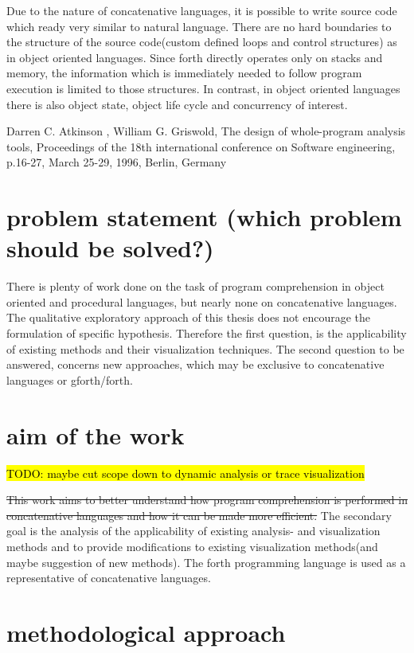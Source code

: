 Due to the nature of concatenative languages, it is possible to write source code which ready very similar to natural language. There are no hard boundaries to the structure of the source code(custom defined loops and control structures) as in object oriented languages. Since forth directly operates only on stacks and memory, the information which is immediately needed to follow program execution is limited to those structures. In contrast, in object oriented languages there is also object state, object life cycle and concurrency of interest.

Darren C. Atkinson , William G. Griswold, The design of whole-program analysis tools, Proceedings of the 18th international conference on Software engineering, p.16-27, March 25-29, 1996, Berlin, Germany

\section{problem statement (which problem should be solved?)}

There is plenty of work done on the task of program comprehension in object oriented and procedural languages\cite{Cornelissen:2009:SSP:1638616.1639301}, but nearly none on concatenative languages. The qualitative exploratory approach of this thesis does not encourage the formulation of specific hypothesis. Therefore the first question, is the applicability of existing methods and their visualization techniques. The second question to be answered, concerns new approaches, which may be exclusive to concatenative languages or gforth/forth.

\section{aim of the work}

\hl{TODO: maybe cut scope down to dynamic analysis or trace visualization}

\sout{This work aims to better understand how program comprehension is performed in concatenative languages and how it can be made more efficient.} The secondary goal is the analysis of the applicability of existing analysis- and visualization methods and to provide modifications to existing visualization methods(and maybe suggestion of new methods). The forth programming language is used as a representative of concatenative languages.

\section{methodological approach}


